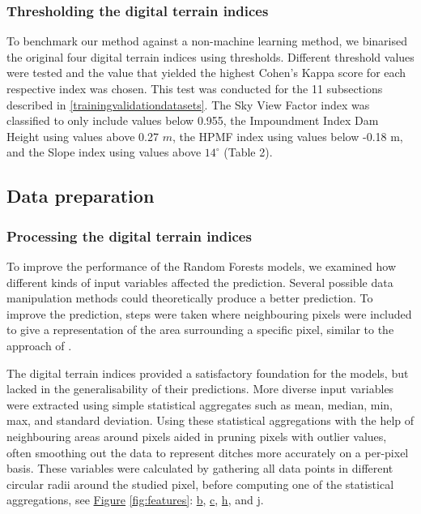 \documentclass[]{interact}
\theoremstyle{plain}%
\theoremstyle{definition}
\theoremstyle{remark}
\begin{document}
\subsubsection{Thresholding the digital terrain indices}
To benchmark our method against a non-machine learning method, we binarised the original four digital terrain indices using thresholds. Different threshold values were tested and the value that yielded the highest Cohen's Kappa score for each respective index was chosen. This test was conducted for the 11 subsections described in \ref{trainingvalidationdatasets}. The Sky View Factor index was classified to only include values below 0.955, the Impoundment Index Dam Height using values above 0.27 $m$, the HPMF index using values below -0.18 m, and the Slope index using values above $14 ^{\circ}$ (Table 2). 

\subsection{Data preparation}

\subsubsection{Processing the digital terrain indices}
To improve the performance of the Random Forests models, we examined how different kinds of input variables affected the prediction. Several possible data manipulation methods could theoretically produce a better prediction. To improve the prediction, steps were taken where neighbouring pixels were included to give a representation of the area surrounding a specific pixel, similar to the approach of \citet{roelens}. 

The digital terrain indices provided a satisfactory foundation for the models, but lacked in the generalisability of their predictions. More diverse input variables were extracted using simple statistical aggregates such as mean, median, min, max, and standard deviation. Using these statistical aggregations with the help of neighbouring areas around pixels aided in pruning pixels with outlier values, often smoothing out the data to represent ditches more accurately on a per-pixel basis. These variables were calculated by gathering all data points in different circular radii around the studied pixel, before computing one of the statistical aggregations, see \hyperref[fig:features]{Figure} \ref{fig:features}: \hyperref[fig:features]{b}, \hyperref[fig:features]{c}, \hyperref[fig:features]{h}, and \hyperref[fig:features]{j}.
\end{document}
